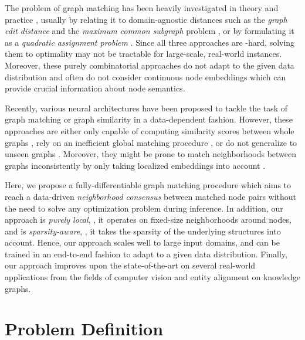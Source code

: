 \documentclass{article}
\begin{document}
The problem of graph matching has been heavily investigated in theory \citep{Grohe/etal/2018} and practice \citep{Conte/etal/2004}, usually by relating it to domain-agnostic distances such as the \emph{graph edit distance} \citep{Stauffer/etal/2017} and the \emph{maximum common subgraph} problem \citep{Bunke/Shearer/1998}, or by formulating it as a \emph{quadratic assignment problem} \citep{Yan/etal/2016}.
Since all three approaches are -hard, solving them to optimality may not be tractable for large-scale, real-world instances.
Moreover, these purely combinatorial approaches do not adapt to the given data distribution and often do not consider continuous node embeddings which can provide crucial information about node semantics.

Recently, various neural architectures have been proposed to tackle the task of graph matching \citep{Zanfir/Sminchisescu/2018,Wang/etal/2019,Zhang/Lee/2019,Xu/etal/2019a,Xu/etal/2019c,Derr/etal/2019,Zhang/etal/2019a,Heimann/etal/2018} or graph similarity \citep{Bai/etal/2018,Bai/etal/2019,Li/etal/2019} in a data-dependent fashion.
However, these approaches are either only capable of computing similarity scores between whole graphs \citep{Bai/etal/2018,Bai/etal/2019,Li/etal/2019}, rely on an inefficient global matching procedure \citep{Zanfir/Sminchisescu/2018,Wang/etal/2019,Xu/etal/2019a,Li/etal/2019}, or do not generalize to unseen graphs \citep{Xu/etal/2019c,Derr/etal/2019,Zhang/etal/2019a}.
Moreover, they might be prone to match neighborhoods between graphs inconsistently by only taking localized embeddings into account \citep{Zanfir/Sminchisescu/2018,Wang/etal/2019,Zhang/Lee/2019,Xu/etal/2019a,Derr/etal/2019,Heimann/etal/2018}.

Here, we propose a fully-differentiable graph matching procedure which aims to reach a data-driven \emph{neighborhood consensus} between matched node pairs without the need to solve any optimization problem during inference.
In addition, our approach is \emph{purely local}, \ie{}, it operates on fixed-size neighborhoods around nodes, and is \emph{sparsity-aware}, \ie{}, it takes the sparsity of the underlying structures into account.
Hence, our approach scales well to large input domains, and can be trained in an end-to-end fashion to adapt to a given data distribution.
Finally, our approach improves upon the state-of-the-art on several real-world applications from the fields of computer vision and entity alignment on knowledge graphs.

\section{Problem Definition}\label{sec:problem_definition}
\end{document}
